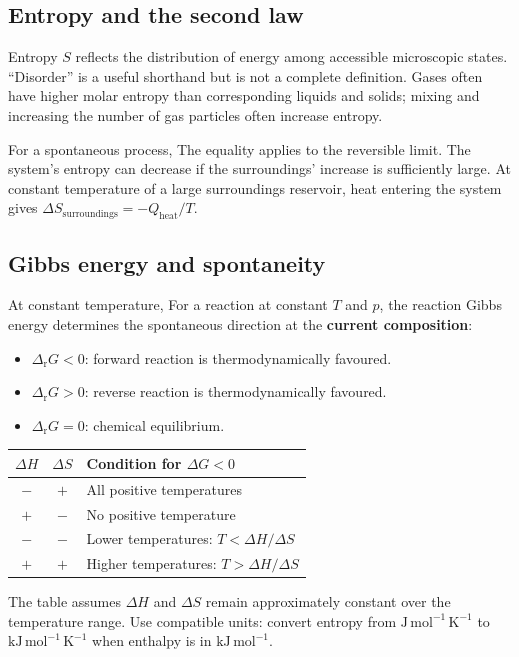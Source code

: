 \documentclass[a4paper,10pt]{article}
\begin{document}
\subsection{Entropy and the second law}
Entropy $S$ reflects the distribution of energy among accessible microscopic
states. ``Disorder'' is a useful shorthand but is not a complete definition.
Gases often have higher molar entropy than corresponding liquids and solids;
mixing and increasing the number of gas particles often increase entropy.

For a spontaneous process,
The equality applies to the reversible limit. The system's entropy can decrease
if the surroundings' increase is sufficiently large. At constant temperature
of a large surroundings reservoir, heat entering the system gives
$\Delta S_{\mathrm{surroundings}}=-Q_{\mathrm{heat}}/T$.

\subsection{Gibbs energy and spontaneity}
At constant temperature,
For a reaction at constant $T$ and $p$, the reaction Gibbs energy determines
the spontaneous direction at the \textbf{current composition}:
\begin{itemize}
  \item $\Delta_{\mathrm r}G<0$: forward reaction is thermodynamically favoured.
  \item $\Delta_{\mathrm r}G>0$: reverse reaction is thermodynamically favoured.
  \item $\Delta_{\mathrm r}G=0$: chemical equilibrium.
\end{itemize}
\begin{center}
\begin{tabular}{@{}ccl@{}}
\toprule
$\Delta H$ & $\Delta S$ & Condition for $\Delta G<0$ \\
\midrule
$-$ & $+$ & All positive temperatures \\
$+$ & $-$ & No positive temperature \\
$-$ & $-$ & Lower temperatures: $T<\Delta H/\Delta S$ \\
$+$ & $+$ & Higher temperatures: $T>\Delta H/\Delta S$ \\
\bottomrule
\end{tabular}
\end{center}
The table assumes $\Delta H$ and $\Delta S$ remain approximately constant over
the temperature range. Use compatible units: convert entropy from
$\mathrm{J\,mol^{-1}\,K^{-1}}$ to $\mathrm{kJ\,mol^{-1}\,K^{-1}}$ when enthalpy
is in $\mathrm{kJ\,mol^{-1}}$.
\end{document}
